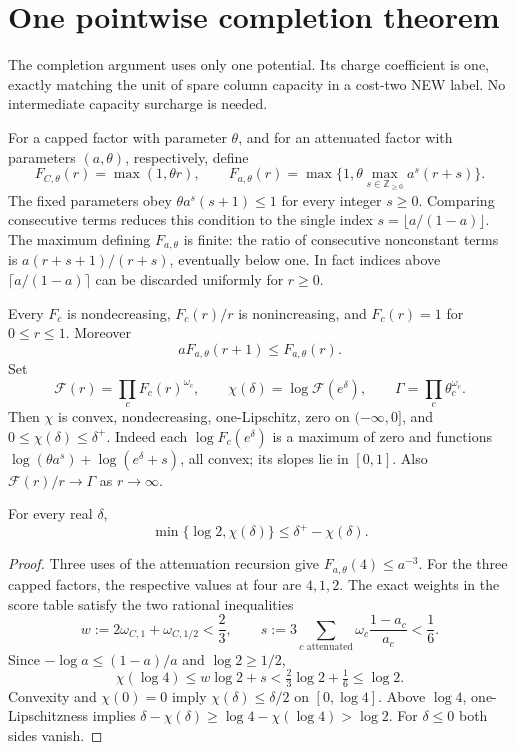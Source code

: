 \section{One pointwise completion theorem}
\label{simp:completion-section}

The completion argument uses only one potential.  Its charge coefficient
is one, exactly matching the unit of spare column capacity in a cost-two
NEW label.  No intermediate capacity surcharge is needed.

For a capped factor with parameter $\theta$, and for an attenuated factor
with parameters $(a,\theta)$, respectively, define
\[
 F_{C,\theta}(r)=\max(1,\theta r),\qquad
 F_{a,\theta}(r)=\max\{1,\theta\max_{s\in\mathbb Z_{\ge0}}a^s(r+s)\}.
\]
The fixed parameters obey $\theta a^s(s+1)\le1$ for every integer $s\ge0$.
Comparing consecutive terms reduces this condition to the single index
$s=\lfloor a/(1-a)\rfloor$.  The maximum defining $F_{a,\theta}$ is
finite: the ratio of consecutive nonconstant terms is
$a(r+s+1)/(r+s)$, eventually below one.  In fact indices above
$\lceil a/(1-a)\rceil$ can be discarded uniformly for $r\ge0$.

Every $F_c$ is nondecreasing, $F_c(r)/r$ is nonincreasing, and $F_c(r)=1$
for $0\le r\le1$.  Moreover
\[
 aF_{a,\theta}(r+1)\le F_{a,\theta}(r).
\]
Set
\[
 \mathcal F(r)=\prod_c F_c(r)^{\omega_c},\qquad
 \chi(\delta)=\log\mathcal F(e^\delta),\qquad
 \Gamma=\prod_c\theta_c^{\omega_c}.
\]
Then $\chi$ is convex, nondecreasing, one-Lipschitz, zero on
$(-\infty,0]$, and $0\le\chi(\delta)\le\delta^+$.
Indeed each $\log F_c(e^\delta)$ is a maximum of zero and functions
$\log(\theta a^s)+\log(e^\delta+s)$, all convex; its slopes lie in $[0,1]$.
Also $\mathcal F(r)/r\to\Gamma$ as $r\to\infty$.

\begin{lemma}\label{simp:unit-charge}
For every real $\delta$,
\[
 \min\{\log2,\chi(\delta)\}\le\delta^+-\chi(\delta).
\]
\end{lemma}
\begin{proof}
Three uses of the attenuation recursion give $F_{a,\theta}(4)\le a^{-3}$.
For the three capped factors, the respective values at four are $4,1,2$.
The exact weights in the score table satisfy the two rational inequalities
\[
 w:=2\omega_{C,1}+\omega_{C,1/2}<\frac23,
 \qquad s:=3\sum_{c\text{ attenuated}}\omega_c\frac{1-a_c}{a_c}<\frac16.
\]
Since $-\log a\le(1-a)/a$ and $\log2\ge1/2$,
\[
 \chi(\log4)\le w\log2+s<\tfrac23\log2+\tfrac16\le\log2.
\]
Convexity and $\chi(0)=0$ imply $\chi(\delta)\le\delta/2$ on
$[0,\log4]$.  Above $\log4$, one-Lipschitzness implies
$\delta-\chi(\delta)\ge\log4-\chi(\log4)>\log2$.
For $\delta\le0$ both sides vanish.
\end{proof}

